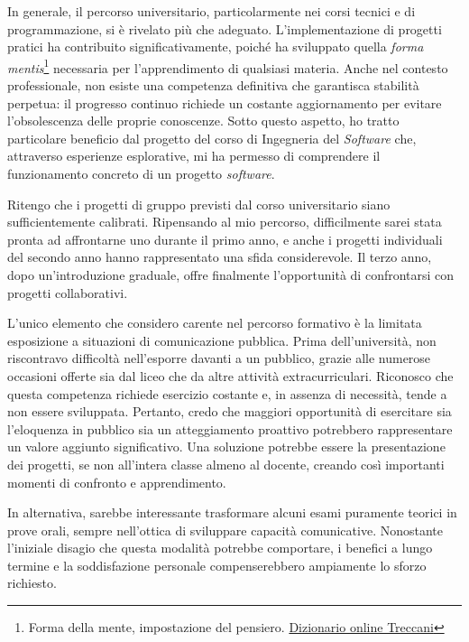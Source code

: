     \vspace{0.2 em}
    \noindent In generale, il percorso universitario, particolarmente nei corsi tecnici e di programmazione, si è rivelato più che adeguato. L'implementazione di progetti pratici ha contribuito significativamente, poiché ha sviluppato quella \textit{forma mentis}\footnote{Forma della mente, impostazione del pensiero. \href{https://www.treccani.it/vocabolario/forma-mentis/}{Dizionario online Treccani}} necessaria per l'apprendimento di qualsiasi materia. Anche nel contesto professionale, non esiste una competenza definitiva che garantisca stabilità perpetua: il progresso continuo richiede un costante aggiornamento per evitare l'obsolescenza delle proprie conoscenze. Sotto questo aspetto, ho tratto particolare beneficio dal progetto del corso di Ingegneria del \textit{Software} che, attraverso esperienze esplorative, mi ha permesso di comprendere il funzionamento concreto di un progetto \textit{software}.

    \vspace{0.2 em}
    \noindent Ritengo che i progetti di gruppo previsti dal corso universitario siano sufficientemente calibrati. Ripensando al mio percorso, difficilmente sarei stata pronta ad affrontarne uno durante il primo anno, e anche i progetti individuali del secondo anno hanno rappresentato una sfida considerevole. Il terzo anno, dopo un'introduzione graduale, offre finalmente l'opportunità di confrontarsi con progetti collaborativi.

    \vspace{0.2 em}
    \noindent L'unico elemento che considero carente nel percorso formativo è la limitata esposizione a situazioni di comunicazione pubblica. Prima dell'università, non riscontravo difficoltà nell'esporre davanti a un pubblico, grazie alle numerose occasioni offerte sia dal liceo che da altre attività extracurriculari. Riconosco che questa competenza richiede esercizio costante e, in assenza di necessità, tende a non essere sviluppata. Pertanto, credo che maggiori opportunità di esercitare sia l'eloquenza in pubblico sia un atteggiamento proattivo potrebbero rappresentare un valore aggiunto significativo. Una soluzione potrebbe essere la presentazione dei progetti, se non all'intera classe almeno al docente, creando così importanti momenti di confronto e apprendimento.

    \vspace{0.2 em}
    \noindent In alternativa, sarebbe interessante trasformare alcuni esami puramente teorici in prove orali, sempre nell'ottica di sviluppare capacità comunicative. Nonostante l'iniziale disagio che questa modalità potrebbe comportare, i benefici a lungo termine e la soddisfazione personale compenserebbero ampiamente lo sforzo richiesto.

    

    